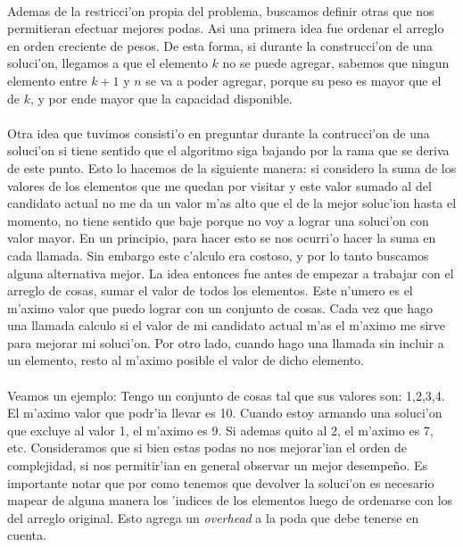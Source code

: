 \paragraph{}
Ademas de la restricci'on propia del problema, buscamos definir otras que nos permitieran efectuar mejores 
podas. Asi una primera idea fue ordenar el arreglo en orden creciente de pesos. De esta forma, si durante 
la construcci'on de una soluci'on, llegamos a que el elemento $k$ no se puede agregar, sabemos que ningun 
elemento entre $k+1$ y $n$ se va a poder agregar, porque su peso es mayor que el de $k$, y por ende mayor 
que la capacidad disponible.
\paragraph{}
Otra idea que tuvimos consisti'o en preguntar durante la contrucci'on de una soluci'on si tiene sentido 
que el algoritmo siga bajando por la rama que se deriva de este punto. Esto lo hacemos de la siguiente 
manera: si considero la suma de los valores de los elementos que me quedan por visitar y este valor 
sumado al del candidato actual no me da un valor m'as alto que el de la mejor soluc'ion hasta el momento, 
no tiene sentido que baje porque no voy a lograr una soluci'on con valor mayor. En un principio, para 
hacer esto se nos ocurri'o hacer la suma en cada llamada. Sin embargo este c'alculo era costoso, y por lo 
tanto buscamos alguna alternativa mejor. La idea entonces fue antes de empezar a trabajar con el arreglo 
de cosas, sumar el valor de todos los elementos. Este n'umero es el m'aximo valor que puedo lograr con 
un conjunto de cosas. Cada vez que hago una llamada calculo si el valor de mi candidato actual m'as el 
m'aximo me sirve para mejorar mi soluci'on. Por otro lado, cuando hago una llamada sin incluir a un 
elemento, resto al m'aximo posible el valor de dicho elemento.\\
\paragraph{}
Veamos un ejemplo: Tengo un conjunto de cosas tal que sus valores son: {1,2,3,4}. El m'aximo valor que podr'ia llevar 
es 10. Cuando estoy armando una soluci'on que excluye al valor 1, el m'aximo es 9. Si ademas quito al 2, 
el m'aximo es 7, etc. Consideramos que si bien estas podas no nos mejorar'ian el orden de complejidad, 
si nos permitir'ian en general observar un mejor desempe\~{n}o. Es importante notar que por como tenemos 
que devolver la soluci'on es necesario mapear de alguna manera los 'indices de los elementos luego de 
ordenarse con los del arreglo original. Esto agrega un \textsl{overhead} a la poda que debe tenerse en cuenta.

